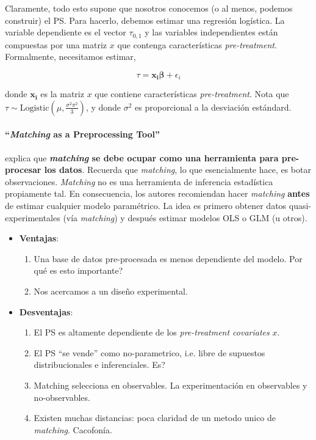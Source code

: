 \documentclass[onesided]{article}\usepackage[]{graphicx}\usepackage[]{color}
\begin{document}
Claramente, todo esto supone que nosotros conocemos (o al menos, podemos construir) el PS. Para hacerlo, debemos estimar una regresi\'on log\'istica. La variable dependiente es el vector $\tau_{0,1}$ y las variables independientes est\'an compuestas por una matriz $x$ que contenga caracter\'isticas \emph{pre-treatment}. Formalmente, necesitamos estimar,

\begin{equation}\label{logit.structural}
\tau = \boldsymbol{x_{i}}\boldsymbol{\beta} + \epsilon_{i}
\end{equation}

donde $\boldsymbol{x_{i}}$ es la matriz $x$ que contiene caracter\'isticas \emph{pre-treatment}. Nota que $\tau \sim \text{Logistic}(\mu, \frac{\sigma^{2}\pi^{2}}{3})$, y donde $\sigma^{2}$ es proporcional a la desviaci\'on est\'andard.

\paragraph{``\emph{Matching} as a Preprocessing Tool''} \textcite{Ho2006} explica que {\bf \emph{matching} se debe ocupar como una herramienta para pre-procesar los datos}. Recuerda que \emph{matching}, lo que esencialmente hace, es botar observaciones. \emph{Matching} no es una herramienta de inferencia estad\'istica propiamente tal. En consecuencia, los autores recomiendan hacer \emph{matching} {\bf antes} de estimar cualquier modelo param\'etrico. La idea es primero obtener datos quasi-experimentales (v\'ia \emph{matching}) y despu\'es estimar modelos OLS o GLM (u otros). 

\begin{itemize}
\item {\bf Ventajas}:
		\begin{enumerate}
			\item Una base de datos pre-procesada es menos dependiente del modelo. {\color{red}Por qu\'e es esto importante?}
			\item Nos acercamos a un dise\~no experimental.
		\end{enumerate}
\item {\bf Desventajas}:
		\begin{enumerate}
			\item El PS es altamente dependiente de los \emph{pre-treatment covariates} $x$. 
			\item El PS ``se vende'' como no-parametrico, i.e. libre de supuestos distribucionales e inferenciales. {\color{red}Es?}
			\item Matching selecciona en observables. La experimentaci\'on en observables y no-observables.
			\item Existen muchas distancias: poca claridad de un metodo unico de \emph{matching}. Cacofon\'ia.
		\end{enumerate}
\end{itemize}
\end{document}
